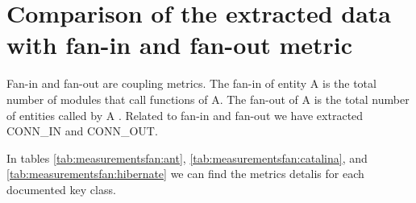 \documentclass[12pt]{mitthesis}
\begin{document}
\begin{table}[!h]
\renewcommand{\arraystretch}{1}
\caption{Measurements for Hibernate using only logical dependencies}
\label{tab:measurementshistory:hibernate}
\centering
{}
\end{table}


\section{Comparison of the extracted data with fan-in and fan-out metric}

Fan-in and fan-out are coupling metrics. The fan-in of entity A is the total number of modules that call functions of A. The fan-out of A is the total number of entities called by A \cite{5507329}.
Related to fan-in and fan-out we have extracted CONN\_IN and CONN\_OUT. 

In tables \ref{tab:measurementsfan:ant}, \ref{tab:measurementsfan:catalina}, and \ref{tab:measurementsfan:hibernate} we can find the metrics detalis for each documented key class.
\end{document}

